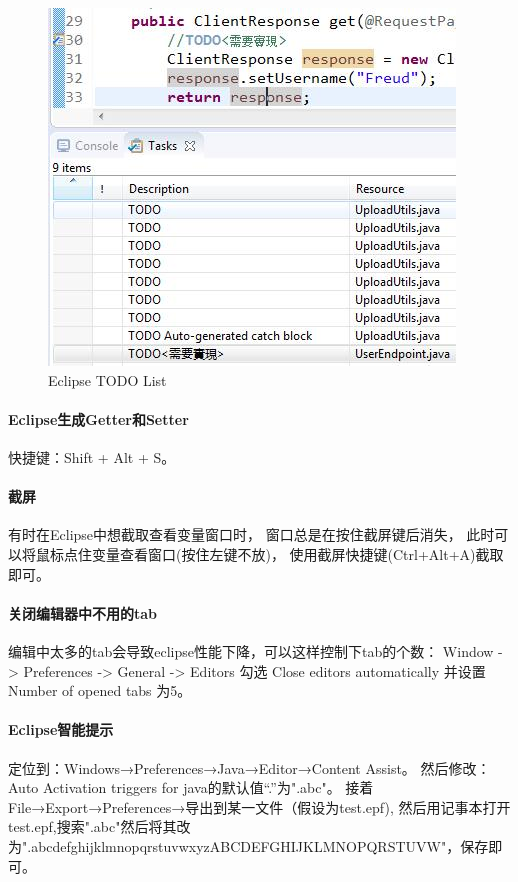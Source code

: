 \documentclass{book}
\begin{document}
\begin{figure}[htbp]
	\centering
	\includegraphics[scale=0.6]{EclipseToDoList.jpg}
	\caption{Eclipse TODO List}
	\label{code:EclipseToDoList}
\end{figure}

\paragraph{Eclipse生成Getter和Setter}

快捷键：Shift + Alt + S。

\paragraph{截屏}
有时在Eclipse中想截取查看变量窗口时，
窗口总是在按住截屏键后消失，
此时可以将鼠标点住变量查看窗口(按住左键不放)，
使用截屏快捷键(Ctrl+Alt+A)截取即可。

\paragraph{关闭编辑器中不用的tab}
编辑中太多的tab会导致eclipse性能下降，可以这样控制下tab的个数：
Window -> Preferences -> General -> Editors
勾选 Close editors automatically 并设置 Number of opened tabs 为5。

\paragraph{Eclipse智能提示}
定位到：Windows→Preferences→Java→Editor→Content Assist。
然后修改：Auto Activation triggers for java的默认值“.”为".abc"。
接着File→Export→Preferences→导出到某一文件（假设为test.epf),
然后用记事本打开test.epf,搜索".abc"然后将其改为".abcdefghijklmnopqrstuvwxyzABCDEFGHIJKLMNOPQRSTUVW"，保存即可。
\end{document}
